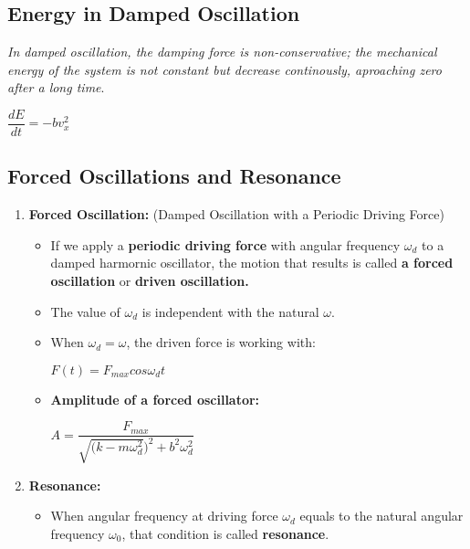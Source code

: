 \documentclass[10pt]{article}
\begin{document}
\begin{enumerate}
\bigbreak
\subsection{Energy in Damped Oscillation}
\textit{In damped oscillation, the damping force is non-conservative; the mechanical energy of the system is not constant but decrease continously, aproaching zero after a long time}. 
\begin{mybox}
	\begin{center}
		$\dfrac{dE}{dt} = -b v_{x}^{2}$
	\end{center}
\end{mybox}
\end{enumerate}

\bigbreak
\subsection{Forced Oscillations and Resonance}
\begin{enumerate}
	\item \textbf{Forced Oscillation:} (Damped Oscillation with a Periodic Driving Force) \\
	\begin{itemize}
		\item If we apply a \textbf{periodic driving force} with angular frequency $\omega_{d}$ to a damped harmornic oscillator, the motion that results is called \textbf{a forced oscillation} or \textbf{driven oscillation.}
		\item The value of $\omega_{d}$ is independent with the natural $\omega$.
		\item When $\omega_{d} = \omega$, the driven force is working with: \\
		\begin{center}
			$F(t) = F_{max} cos \omega_{d} t$
		\end{center}
		\item \textbf{Amplitude of a forced oscillator:} \\
		\begin{mybox}
			\begin{center}
				$A = \dfrac{F_{max}}{\sqrt{(k - m \omega_{d}^{2}})^{2} + b^{2} \omega_d^{2}}$
			\end{center}
		\end{mybox}
	\end{itemize}
	\item \textbf{Resonance: }
	\begin{itemize}
		\item When angular frequency at driving force $\omega_{d}$ equals to the natural angular frequency $\omega_{0}$, that condition is called \textbf{resonance}.
	\end{itemize}
\end{enumerate}
\bigbreak
\end{document}
